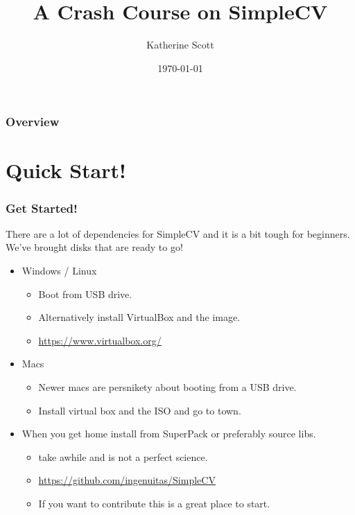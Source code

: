 \documentclass{beamer}
\title[How do I SimpleCV?]{A Crash Course on SimpleCV} %
\author{Katherine Scott} %
\institute[SightMachine] %
{
SightMachine \\ %
\medskip
\textit{kat@sightmachine.com}
\textit{anthony@sightmachine.com} %
}
\date{\today} %
\begin{document}
\begin{frame}
\titlepage %
\end{frame}

\begin{frame}
\frametitle{Overview} %
\tableofcontents %
\end{frame}

\section{Quick Start!}
 \begin{frame}
   \frametitle{Get Started!}
   There are a lot of dependencies for SimpleCV and it is a bit tough for
   beginners. We've brought disks that are ready to go!
   \begin{itemize}
     \item Windows / Linux
       \begin{itemize}
         \item Boot from USB drive.
         \item Alternatively install VirtualBox and the image. 
         \item \url{https://www.virtualbox.org/}
         \end{itemize}
     \item Macs 
       \begin{itemize}
         \item Newer macs are persnikety about booting from a USB drive.
         \item Install virtual box and the ISO and go to town. 
         \end{itemize}
     \item When you get home install from SuperPack or preferably source libs.
       \begin{itemize}
         \item take awhile and is not a perfect science.
         \item \url{https://github.com/ingenuitas/SimpleCV}
         \item If you want to contribute this is a great place to start.
         \end{itemize}
    \end{itemize}
 \end{frame}
\end{document}
